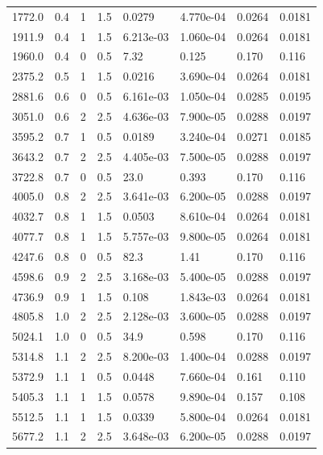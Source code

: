 \documentclass[preview]{standalone}
\begin{document}
{{\begin{tabular}{L{1.2cm}C{1.2cm} C{0.3cm}C{0.5cm} C{1.4cm}C{1.4cm} C{1.4cm}C{1.4cm}}
  1772.0  &   0.4  & 1     & 1.5 &  0.0279  & 4.770e-04  & 0.0264 &  0.0181   \\ 
  1911.9  &   0.4  & 1     & 1.5 &  6.213e-03  & 1.060e-04  & 0.0264 &  0.0181   \\ 
  1960.0  &   0.4  & 0     & 0.5 &  7.32  & 0.125  & 0.170 &  0.116   \\ 
  2375.2  &   0.5  & 1     & 1.5 &  0.0216  & 3.690e-04  & 0.0264 &  0.0181   \\ 
  2881.6  &   0.6  & 0     & 0.5 &  6.161e-03  & 1.050e-04  & 0.0285 &  0.0195   \\ 
  3051.0  &   0.6  & 2     & 2.5 &  4.636e-03  & 7.900e-05  & 0.0288 &  0.0197   \\ 
  3595.2  &   0.7  & 1     & 0.5 &  0.0189  & 3.240e-04  & 0.0271 &  0.0185   \\ 
  3643.2  &   0.7  & 2     & 2.5 &  4.405e-03  & 7.500e-05  & 0.0288 &  0.0197   \\ 
  3722.8  &   0.7  & 0     & 0.5 &  23.0  & 0.393  & 0.170 &  0.116   \\ 
  4005.0  &   0.8  & 2     & 2.5 &  3.641e-03  & 6.200e-05  & 0.0288 &  0.0197   \\ 
  4032.7  &   0.8  & 1     & 1.5 &  0.0503  & 8.610e-04  & 0.0264 &  0.0181   \\ 
  4077.7  &   0.8  & 1     & 1.5 &  5.757e-03  & 9.800e-05  & 0.0264 &  0.0181   \\ 
  4247.6  &   0.8  & 0     & 0.5 &  82.3  & 1.41  & 0.170 &  0.116   \\ 
  4598.6  &   0.9  & 2     & 2.5 &  3.168e-03  & 5.400e-05  & 0.0288 &  0.0197   \\ 
  4736.9  &   0.9  & 1     & 1.5 &  0.108  & 1.843e-03  & 0.0264 &  0.0181   \\ 
  4805.8  &   1.0  & 2     & 2.5 &  2.128e-03  & 3.600e-05  & 0.0288 &  0.0197   \\ 
  5024.1  &   1.0  & 0     & 0.5 &  34.9  & 0.598  & 0.170 &  0.116   \\ 
  5314.8  &   1.1  & 2     & 2.5 &  8.200e-03  & 1.400e-04  & 0.0288 &  0.0197   \\ 
  5372.9  &   1.1  & 1     & 0.5 &  0.0448  & 7.660e-04  & 0.161 &  0.110   \\ 
  5405.3  &   1.1  & 1     & 1.5 &  0.0578  & 9.890e-04  & 0.157 &  0.108   \\ 
  5512.5  &   1.1  & 1     & 1.5 &  0.0339  & 5.800e-04  & 0.0264 &  0.0181   \\ 
  5677.2  &   1.1  & 2     & 2.5 &  3.648e-03  & 6.200e-05  & 0.0288 &  0.0197   \\ 

\end{tabular}}}
\end{document}

